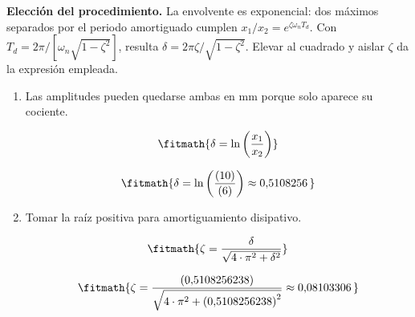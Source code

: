 \noindent\textbf{Elección del procedimiento.} La envolvente es exponencial: dos máximos separados por el periodo amortiguado cumplen $x_1/x_2=e^{\zeta\omega_nT_d}$. Con $T_d=2\pi/[\omega_n\sqrt{1-\zeta^2}]$, resulta $\delta=2\pi\zeta/\sqrt{1-\zeta^2}$. Elevar al cuadrado y aislar $\zeta$ da la expresión empleada.

\begin{enumerate}

\item Las amplitudes pueden quedarse ambas en mm porque solo aparece su cociente.

\[\fitmath{\delta=\ln\left(\frac{x_{1}}{x_{2}}\right)}\]

\[\fitmath{\delta=\ln\left(\frac{(10)}{(6)}\right)\approx 0{,}5108256\,}\]

\item Tomar la raíz positiva para amortiguamiento disipativo.

\[\fitmath{\zeta=\frac{\delta}{\sqrt{4\cdot {\pi}^{2}+{\delta}^{2}}}}\]

\[\fitmath{\zeta=\frac{(0{,}5108256238)}{\sqrt{4\cdot {\pi}^{2}+{(0{,}5108256238)}^{2}}}\approx 0{,}08103306\,}\]

\end{enumerate}
